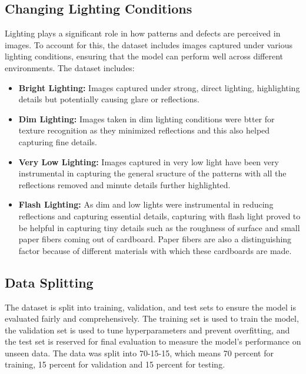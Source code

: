 \subsection{Changing Lighting Conditions}

Lighting plays a significant role in how patterns and defects are perceived in images. To account for this, the dataset includes images captured under various lighting conditions, ensuring that the model can perform well across different environments. The dataset includes:


\begin{itemize}
	\item \textbf{Bright Lighting:} Images captured under strong, direct lighting, highlighting details but potentially causing glare or reflections.
	\item \textbf{Dim Lighting: } Images taken in dim lighting conditions were btter for texture recognition as they minimized reflections and this also helped capturing fine details.
	\item \textbf{Very Low Lighting:} Images captured in very low light have been very instrumental in capturing the general sructure of the patterns with all the reflections removed and minute details further highlighted.
	\item \textbf{Flash Lighting:} As dim and low lights were instrumental in reducing reflections and capturing essential details, capturing with flash light proved to be helpful in capturing tiny details such as the roughness of surface and small paper fibers coming out of cardboard. Paper fibers are also a distinguishing factor because of different materials with which these cardboards are made.
	
	
\end{itemize}


\subsection{Data Splitting}

The dataset is split into training, validation, and test sets to ensure the model is evaluated fairly and comprehensively. The training set is used to train the model, the validation set is used to tune hyperparameters and prevent overfitting, and the test set is reserved for final evaluation to measure the model's performance on unseen data. The data was split into 70-15-15, which means 70 percent for training, 15 percent for validation and 15 percent for testing.



